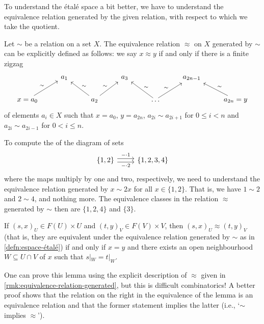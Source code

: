 To understand the étalé space a bit better, we have to understand the equivalence relation generated by the given relation, with respect to which we take the quotient.

\begin{rmk}\label{rmk:equivalence-relation-generated}
Let $\sim$ be a relation on a set $X$.
The equivalence relation $\approx$ on $X$ generated by $\sim$ can be explicitly defined as follows: we say $x\approx y$ if and only if there is a finite zigzag
\begin{equation*}
    \begin{tikzcd}
        & a_1 & & a_3 & & a_{2n-1} \\
        x = a_0 \ar[ru, "\sim"] & & a_2 \ar[lu, "\sim"'] \ar[ru, "\sim"] & & \ldots \ar[lu, "\sim"'] \ar[ru, "\sim"] & & a_{2n}=y \ar[lu, "\sim"']
    \end{tikzcd}
\end{equation*}
of elements $a_i\in X$ such that $x=a_0$, $y=a_{2n}$, $a_{2i}\sim a_{2i+1}$ for $0\leq i<n$ and $a_{2i}\sim a_{2i-1}$ for $0<i\leq n$.
\end{rmk}

\begin{exmp}
To compute the  of the diagram of sets
\begin{equation*}
    \begin{tikzcd}
        \{1,2\} \ar[r, shift left, "-\cdot 1"] \ar[r, shift right, "-\cdot 2"'] & \{1,2,3,4\}
    \end{tikzcd}
\end{equation*}
where the maps multiply by one and two, respectively, we need to understand the equivalence relation generated by $x\sim 2x$ for all $x\in\{1,2\}$.
That is, we have $1\sim 2$ and $2\sim 4$, and nothing more.
The equivalence classes in the relation $\approx$ generated by $\sim$ then are $\{1,2,4\}$ and $\{3\}$.
\end{exmp}

\begin{lem}
If $(s,x)_U\in F(U)\times U$ and $(t,y)_V\in F(V)\times V$, then $(s,x)_U\approx (t,y)_V$ (that is, they are equivalent under the equivalence relation generated by $\sim$ as in \cref{defn:espace-étalé}) if and only if $x = y$ and there exists an open neighbourhood $W\subseteq U\cap V$ of $x$ such that $s|_W = t|_W$.
\end{lem}

One can prove this lemma using the explicit description of $\approx$ given in \cref{rmk:equivalence-relation-generated}, but this is difficult combinatorics!
A better proof shows that the relation on the right in the equivalence of the lemma is an equivalence relation and that the former statement implies the latter (i.e., `$\sim$ implies $\approx$').

